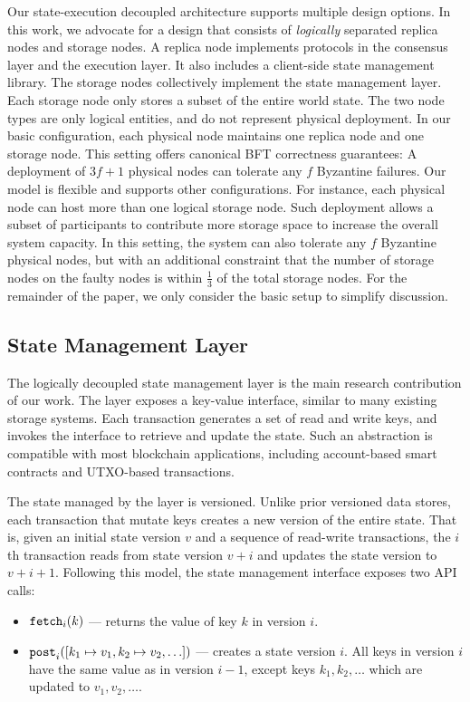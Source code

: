 Our state-execution decoupled architecture supports multiple design options.
In this work, we advocate for a design that consists of \emph{logically} separated replica nodes and storage nodes.
A replica node implements protocols in the consensus layer and the execution layer.
It also includes a client-side state management library.
The storage nodes collectively implement the state management layer.
Each storage node only stores a subset of the entire world state.
The two node types are only logical entities, and do not represent physical deployment.
In our basic configuration, each physical node maintains one replica node and one storage node.
This setting offers canonical BFT correctness guarantees: A deployment of $3f+1$ physical nodes can tolerate any $f$ Byzantine failures.
Our model is flexible and supports other configurations.
For instance, each physical node can host more than one logical storage node.
Such deployment allows a subset of participants to contribute more storage space to increase the overall system capacity.
In this setting, the system can also tolerate any $f$ Byzantine physical nodes, but with an additional constraint that the number of storage nodes on the faulty nodes is within $\frac{1}{3}$ of the total storage nodes.
For the remainder of the paper, we only consider the basic setup to simplify discussion.

\subsection{State Management Layer}
\label{sec:arch:layer}

The logically decoupled state management layer is the main research contribution of our work.
The layer exposes a key-value interface, similar to many existing storage systems.
Each transaction generates a set of read and write keys, and invokes the interface to retrieve and update the state.
Such an abstraction is compatible with most blockchain applications, including account-based smart contracts and UTXO-based transactions.

The state managed by the layer is versioned.
Unlike prior versioned data stores, each transaction that mutate keys creates a new version of the entire state.
That is, given an initial state version $v$ and a sequence of read-write transactions, the $i$th transaction reads from state version $v+i$ and updates the state version to $v+i+1$.
Following this model, the state management interface exposes two API calls:

\begin{itemize}
    \item $\texttt{fetch}_{i}(k)$ --- returns the value of key $k$ in version $i$.

    \item $\texttt{post}_{i}([k_1 \mapsto v_1, k_2 \mapsto v_2, \ldots])$ --- creates a state version $i$.
    All keys in version $i$ have the same value as in version $i-1$, except keys $k_1, k_2, \ldots$ which are updated to $v_1, v_2, \ldots$.
\end{itemize}


